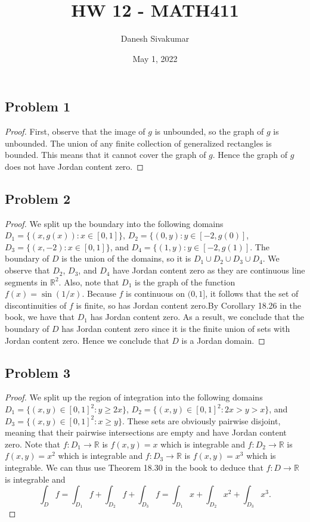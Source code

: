 \documentclass{article}
\title{HW 12 - MATH411}
\author{Danesh Sivakumar}
\date{May 1, 2022}
\begin{document}
\maketitle 


\subsection*{Problem 1}

\begin{proof}
First, observe that the image of $g$ is unbounded, so the graph of $g$ is unbounded. The union of any finite collection of generalized rectangles is bounded. This means that it cannot cover the graph of $g$. Hence the graph of $g$ does not have Jordan content zero.

\end{proof}


\subsection*{Problem 2}

\begin{proof} 
We split up the boundary into the following domains $D_1 = \{(x,g(x)) : x \in [0,1]\}$, $D_2 = \{(0,y): y \in [-2,g(0)]$, $D_3 = \{(x,-2) : x \in [0,1]\}$, and $D_4 = \{(1,y): y \in [-2,g(1)]$. The boundary of $D$ is the union of the domains, so it is $D_1 \cup D_2 \cup D_3 \cup D_4$. We observe that $D_2$, $D_3$, and $D_4$ have Jordan content zero as they are continuous line segments in $\mathbb{R}^2$. Also, note that $D_1$ is the graph of the function $f(x) = \sin(1/x)$. Because $f$ is continuous on $(0,1]$, it follows that the set of discontinuities of $f$ is finite, so has Jordan content zero.By Corollary 18.26 in the book, we have that $D_1$ has Jordan content zero. As a result, we conclude that the boundary of $D$ has Jordan content zero since it is the finite union of sets with Jordan content zero. Hence we conclude that $D$ is a Jordan domain.
\end{proof}

\subsection*{Problem 3}

\begin{proof}
We split up the region of integration into the following domains $D_1 = \{(x,y) \in [0,1]^2 : y \geq 2x \}$, $D_2 = \{(x,y) \in [0,1]^2 : 2x > y > x \}$, and $D_3 = \{(x,y) \in [0,1]^2 : x \geq y \}$.  These sets are obviously pairwise disjoint, meaning that their pairwise intersections are empty and have Jordan content zero. Note that $f \colon D_1 \to \mathbb{R}$ is $f(x,y) = x$ which is integrable and $f \colon D_2 \to \mathbb{R}$ is $f(x,y) = x^2$ which is integrable and $f \colon D_3 \to \mathbb{R}$ is $f(x,y) = x^3$ which is integrable. We can thus use Theorem 18.30 in the book to deduce that $f \colon D \to \mathbb{R}$ is integrable and \[\int_D f = \int_{D_1} f + \int_{D_2} f + \int_{D_3} f = \int_{D_1} x + \int_{D_2} x^2 + \int_{D_3} x^3.\]
\end{proof}
\end{document}
